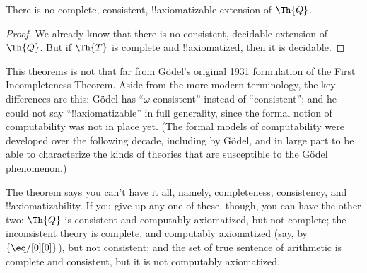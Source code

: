 \documentclass[../../../include/open-logic-section]{subfiles}
\begin{document}


\begin{thm}
There is no complete, consistent, !!{axiomatizable} extension of
$\Th{Q}$.
\end{thm}

\begin{proof}
We already know that there is no consistent, decidable extension of
$\Th{Q}$. But if $\Th{T}$ is complete and !!{axiomatized}, then
it is decidable. 
\end{proof}

\begin{explain}
This theorems is not that far from G\"odel's original 1931 formulation
of the First Incompleteness Theorem. Aside from the more modern
terminology, the key differences are this: G\"odel has
``$\omega$-consistent'' instead of ``consistent''; and he could not
say ``!!{axiomatizable}'' in full generality, since the formal
notion of computability was not in place yet. (The formal models of
computability were developed over the following decade, including by
G\"odel, and in large part to be able to characterize the kinds of
theories that are susceptible to the G\"odel phenomenon.)

The theorem says you can't have it all, namely, completeness,
consistency, and !!{axiomatizability}. If you give up any one of
these, though, you can have the other two: $\Th{Q}$ is consistent and
computably axiomatized, but not complete; the inconsistent theory is
complete, and computably axiomatized (say, by $\{ \eq/[0][0] \}$), but
not consistent; and the set of true sentence of arithmetic is complete
and consistent, but it is not computably axiomatized.
\end{explain}
\end{document}
